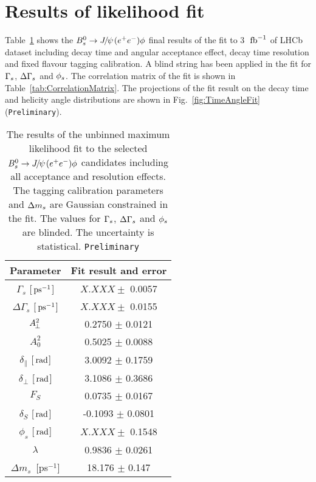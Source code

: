 \clearpage

\section{Results of likelihood fit}\label{sec:Results}

Table~\ref{tab:FitResults} shows the ${{B}^0_{s}}\rightarrow{\ensuremath{{J\mskip -3mu/\mskip -2mu\psi\mskip 2mu}}}({e^+e^-})\phi$ final results of the fit to 3~$\mbox{\,fb}^{-1}$ of LHCb dataset including decay time and angular acceptance effect, decay time resolution and fixed flavour tagging calibration. A blind string has been applied in the fit for ${\Gamma_{{s}}}$, ${\Delta\Gamma_{{s}}}$ and ${\phi_{{s}}}$. The correlation matrix of the fit is shown in Table~\ref{tab:CorrelationMatrix}. The projections of the fit result on the decay time and helicity angle distributions are shown in Fig.~\ref{fig:TimeAngleFit} ({\tt Preliminary}).

\begin{table}[htb]
  \caption{
   The results of the unbinned maximum likelihood fit to the selected ${{B}^0_{s}}\rightarrow{\ensuremath{{J\mskip -3mu/\mskip -2mu\psi\mskip 2mu}}}({e^+e^-})\phi$ candidates including all acceptance and resolution effects. The tagging calibration parameters and ${\Delta m_{{s}}}$ are Gaussian constrained in the fit. The values for ${\Gamma_{{s}}}$, ${\Delta\Gamma_{{s}}}$ and ${\phi_{{s}}}$ are blinded. The uncertainty is statistical. {\tt Preliminary}}
    \small{
\begin{center}\begin{tabular}{cc}
Parameter & Fit result and error \\ 		\hline
            $\Gamma_{s}$ [${\mathrm{ \,ps}}^{-1}$] &       $X.XXX \pm$ 0.0057                \\
      $\Delta\Gamma_{s}$ [${\mathrm{ \,ps}}^{-1}$]&         $X.XXX \pm$  0.0155                \\
$A_{\hspace{-1pt}\perp}^{2}$ &      0.2750 $\pm$   0.0121                \\
             $A_0^2$ &      0.5025 $\pm$  0.0088                \\
  $\delta_\parallel$ [$\mathrm{ \,rad}$] &       3.0092 $\pm$    0.1759                \\
      $\delta_\perp$ [$\mathrm{ \,rad}$] &          3.1086 $\pm$    0.3686                \\
               $F_S$ &     0.0735 $\pm$   0.0167                \\
          $\delta_S$ [$\mathrm{ \,rad}$] &     -0.1093 $\pm$   0.0801                \\
            $\phi_s$ [$\mathrm{ \,rad}$] &      $X.XXX \pm$    0.1548                \\
           $\lambda$ &      0.9836 $\pm$   0.0261                \\
           $\Delta m_s$~[ps$^{-1}$] &       18.176 $\pm$    0.147                \\
\hline
\end{tabular}\end{center}
  }
\label{tab:FitResults}
\end{table}

